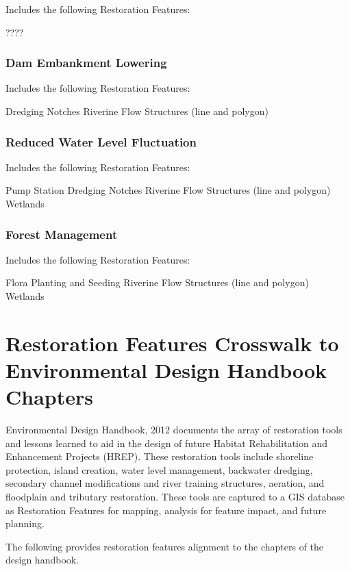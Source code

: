 \documentclass[
  letterpaper,
  DIV=11,
  numbers=noendperiod]{scrreprt}
\begin{document}
Includes the following Restoration Features:

????

\subsection{Dam Embankment Lowering}\label{dam-embankment-lowering}

Includes the following Restoration Features:

Dredging Notches Riverine Flow Structures (line and polygon)

\subsection{Reduced Water Level
Fluctuation}\label{reduced-water-level-fluctuation}

Includes the following Restoration Features:

Pump Station Dredging Notches Riverine Flow Structures (line and
polygon) Wetlands

\subsection{Forest Management}\label{forest-management}

Includes the following Restoration Features:

Flora Planting and Seeding Riverine Flow Structures (line and polygon)
Wetlands

\chapter{Restoration Features Crosswalk to Environmental Design Handbook
Chapters}\label{restoration-features-crosswalk-to-environmental-design-handbook-chapters}

Environmental Design Handbook, 2012 documents the array of restoration
tools and lessons learned to aid in the design of future Habitat
Rehabilitation and Enhancement Projects (HREP). These restoration tools
include shoreline protection, island creation, water level management,
backwater dredging, secondary channel modifications and river training
structures, aeration, and floodplain and tributary restoration. These
tools are captured to a GIS database as Restoration Features for
mapping, analysis for feature impact, and future planning.

The following provides restoration features alignment to the chapters of
the design handbook.
\end{document}
